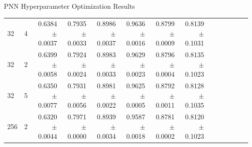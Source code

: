 \documentclass[aspectratio=169,xcolor=table]{beamer}
\begin{document}
\begin{frame}{PNN Hyperparameter Optimization Results}
\begin{table}
\begin{center}
{\begin{tabular}{llrrrrrrrrrrrr}
          32 &  4 & 0.6384  $\pm$ 0.0037  & 0.7935  $\pm$ 0.0033  & 0.8986  $\pm$ 0.0037  & 0.9636  $\pm$ 0.0016  & 0.8799  $\pm$ 0.0009  & 0.8139  $\pm$ 0.1031  \\
          32 &  2 & 0.6399  $\pm$ 0.0058  & 0.7924  $\pm$ 0.0024  & 0.8983  $\pm$ 0.0033  & 0.9629  $\pm$ 0.0023  & 0.8796  $\pm$ 0.0004  & 0.8135  $\pm$ 0.1023  \\
          32 &  5 & 0.6350  $\pm$ 0.0077  & 0.7931  $\pm$ 0.0056  & 0.8981  $\pm$ 0.0022  & 0.9625  $\pm$ 0.0005  & 0.8792  $\pm$ 0.0011  & 0.8128  $\pm$ 0.1035  \\
          256 & 2 & 0.6320  $\pm$ 0.0044  & 0.7971  $\pm$ 0.0000  & 0.8939  $\pm$ 0.0034  & 0.9587  $\pm$ 0.0018  & 0.8781  $\pm$ 0.0002  & 0.8120  $\pm$ 0.1023  \\
        \bottomrule
        \end{tabular}}
          \end{center}
      \end{table}
    \end{frame}
\end{document}
